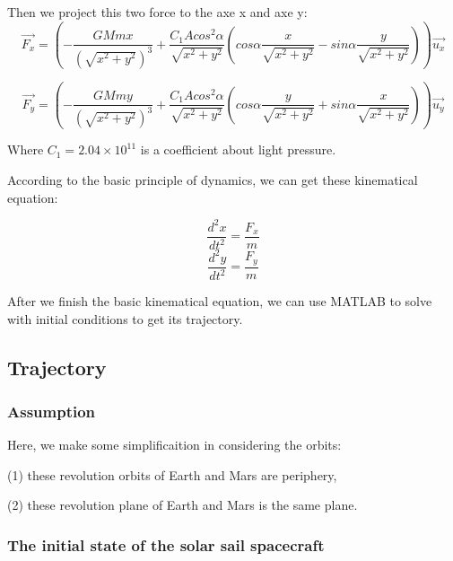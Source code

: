 \documentclass[../Paper.tex]{subfiles}
\begin{document}
Then we project this two force to the axe x and axe y:
\begin{equation}
\vec{F_x} = (-\frac{GMmx}{(\sqrt{x^2+y^2})^3} + \dfrac{C_{1} A cos^2 \alpha}{\sqrt{x^2+y^2}} (cos\alpha\frac{x}{\sqrt{x^2+y^2}} - sin\alpha\frac{y}{\sqrt{x^2+y^2}}))\vec{u_x}
\label{eq:diffx}
\end{equation}

\begin{equation}
\vec{F_y} = (-\frac{GMmy}{(\sqrt{x^2+y^2})^3} + \dfrac{C_{1} A cos^2 \alpha}{\sqrt{x^2+y^2}} (cos\alpha\frac{y}{\sqrt{x^2+y^2}} + sin\alpha\frac{x}{\sqrt{x^2+y^2}}))\vec{u_y}
\label{eq:diffy}
\end{equation}

Where $C_1 = 2.04 \times 10^11 $ is a coefficient about light pressure.

According to the basic principle of dynamics, we can get these kinematical equation:

\begin{equation}
\frac{d^2x}{dt^2} = \frac{F_x}{m}
\end{equation}
\begin{equation}
\frac{d^2y}{dt^2} = \frac{F_y}{m}
\end{equation}

After we finish the basic kinematical equation, we can use MATLAB to solve with initial conditions to get its trajectory.

\subsection{Trajectory}

\subsubsection{Assumption}

Here, we make some simplificaition in considering the orbits: 

(1) these revolution orbits of Earth and Mars are periphery,          

(2) these revolution plane of Earth and Mars is the same plane.   

\subsubsection{The initial state of the solar sail spacecraft}
\end{document}
